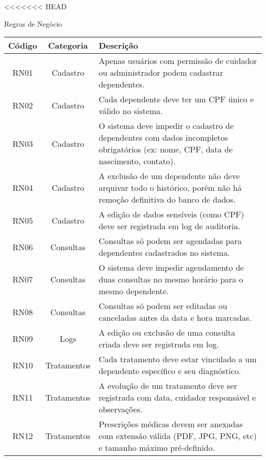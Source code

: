 <<<<<<< HEAD
\begin{quadro}
    \caption{\label{quadro_regras_negocio}Regras de Negócio}
    \begin{tabular}{|c|c|p{10cm}|}
        \hline
        \textbf{Código} & \textbf{Categoria} & \textbf{Descrição} \\ \hline
        RN01   & Cadastro                       & Apenas usuários com permissão de cuidador ou administrador podem cadastrar dependentes. \\ \hline
        RN02   & Cadastro                       & Cada dependente deve ter um CPF único e válido no sistema. \\ \hline
        RN03   & Cadastro                       & O sistema deve impedir o cadastro de dependentes com dados incompletos obrigatórios (ex: nome, CPF, data de nascimento, contato). \\ \hline
        RN04   & Cadastro                       & A exclusão de um dependente não deve arquivar todo o histórico, porém não há remoção definitiva do banco de dados. \\ \hline
        RN05   & Cadastro                       & A edição de dados sensíveis (como CPF) deve ser registrada em log de auditoria. \\ \hline
        RN06   & Consultas                     & Consultas só podem ser agendadas para dependentes cadastrados no sistema. \\ \hline
        RN07   & Consultas                     & O sistema deve impedir agendamento de duas consultas no mesmo horário para o mesmo dependente. \\ \hline
        RN08   & Consultas                     & Consultas só podem ser editadas ou canceladas antes da data e hora marcadas. \\ \hline
        RN09   & Logs                          & A edição ou exclusão de uma consulta criada deve ser registrada em log. \\ \hline
        RN10   & Tratamentos                   & Cada tratamento deve estar vinculado a um dependente específico e seu diagnóstico. \\ \hline
        RN11   & Tratamentos                   & A evolução de um tratamento deve ser registrada com data, cuidador responsável e observações. \\ \hline
        RN12   & Tratamentos                   & Prescrições médicas devem ser anexadas com extensão válida (PDF, JPG, PNG, etc) e tamanho máximo pré-definido. \\ \hline

\end{tabular}
\end{quadro}
